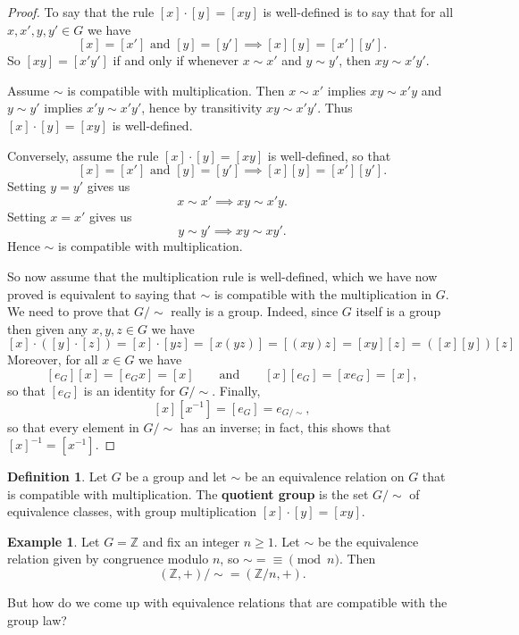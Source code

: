 \documentclass[12pt]{report}
\numberwithin{equation}{section}
\numberwithin{theorem}{chapter}
\theoremstyle{definition}
\newtheorem{definition}[theorem]{Definition}
\newtheorem{example}[theorem]{Example}
\newtheorem*{basic properties}{Basic Properties}
\newtheorem*{Important Remark}{Important Remark}
\newcommand{\df}[1]{{\bf #1}\index{#1}}
\newcommand{\Z}{\mathbb{Z}}
\begin{document}
\begin{proof} 
To say that the rule $[x] \cdot [y] = [xy]$ is well-defined is to say that for all $x, x', y, y' \in G$ we have
$$[x]=[x'] \textrm{ and } [y]=[y'] \implies [x][y]=[x'][y'].$$ 
So $[xy]=[x'y']$ if and only if whenever $x\sim x'$ and $y\sim y'$, then $xy\sim x'y'$.

Assume $\sim$ is compatible with multiplication. Then $x\sim x'$ implies $xy\sim x'y$ and $y\sim y'$ implies $x'y\sim x'y'$, hence by transitivity $xy\sim x'y'$. Thus $[x] \cdot [y] = [xy]$ is well-defined.

Conversely, assume the rule $[x] \cdot [y] = [xy]$ is well-defined, so that
$$[x]=[x'] \textrm{ and } [y]=[y'] \implies [x][y]=[x'][y'].$$ 
Setting $y=y'$ gives us
$$x\sim x' \implies xy\sim x'y.$$ 
Setting $x=x'$ gives us 
$$y\sim y' \implies xy\sim xy'.$$ 
Hence $\sim$ is compatible with multiplication.



So now assume that the multiplication rule is well-defined, which we have now proved is equivalent to saying that $\sim$ is compatible with the multiplication in $G$. We need to prove that $G/\sim$ really is a group. Indeed, since $G$ itself is a group then given any $x,y,z \in G$ we have 
$$[x] \cdot ([y] \cdot [z]) = [x] \cdot [yz] = [x(yz)] = [(xy)z] = [xy][z] = ([x][y])[z]$$ 
Moreover, for all $x \in G$ we have
$$[e_G] [x] = [e_G x] = [x] \qquad \textrm{and} \qquad  [x] [e_G] = [x e_G] = [x],$$ 
so that $[e_G]$ is an identity for $G/\sim$. Finally,
$$[x][x^{-1}] = [e_G] = e_{G/\sim},$$ 
so that every element in $G/\sim$ has an inverse; in fact, this shows that $[x]^{-1} = [x^{-1}]$. 
\end{proof}


\begin{definition}
Let $G$ be a group and let $\sim$ be an equivalence relation on $G$ that is compatible with multiplication. The \df{quotient group} is the set $G/\sim$ of equivalence classes, with group multiplication $[x]\cdot [y] = [xy]$. 
\end{definition}


\begin{example}
Let $G=\Z$ and fix an integer $n \geqslant 1$. Let $\sim$ be the equivalence relation given by congruence modulo $n$, so $\sim = \equiv \pmod n$. Then 
$$(\Z,+)/\sim = (\Z/n,+).$$
\end{example}


But how do we come up with equivalence relations that are compatible with the group law?
\end{document}
